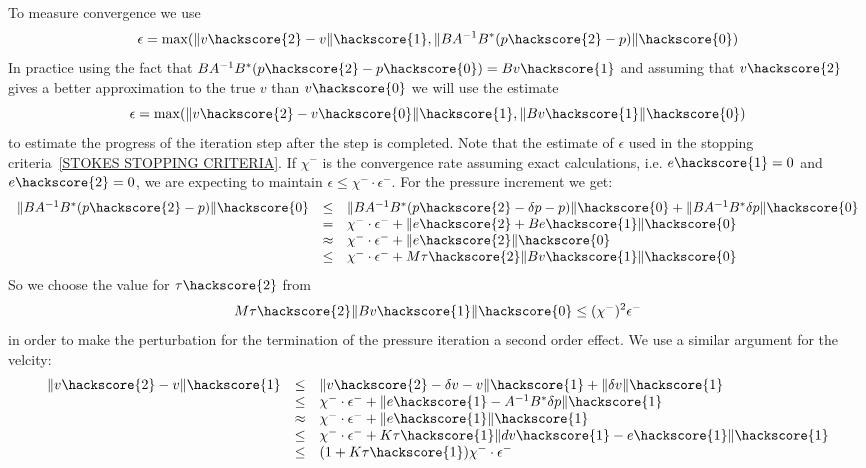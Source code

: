 To measure convergence we use
\begin{equation} 
\epsilon = \max(\|v\hackscore{2}-v\|\hackscore{1}, \|B A^{-1} B^{*} (p\hackscore{2}-p)\|\hackscore{0})
\end{equation}
In practice using the fact that $B A^{-1} B^{*} (p\hackscore{2}-p\hackscore{0}) = B v\hackscore{1}$
and assuming that $v\hackscore{2}$ gives a better approximation to the true $v$ than
$v\hackscore{0}$ we will use the estimate
\begin{equation} 
\epsilon = \max(\|v\hackscore{2}-v\hackscore{0}\|\hackscore{1}, \|B v\hackscore{1}\|\hackscore{0})
\end{equation}
to estimate the progress of the iteration step after the step is completed. 
Note that the estimate of $\epsilon$   
used in the stopping criteria~\ref{STOKES STOPPING CRITERIA}. If $\chi^{-}$ is the convergence rate assuming
exact calculations, i.e. $e\hackscore{1}=0$ and $e\hackscore{2}=0$, we are expecting 
to maintain $\epsilon \le \chi^{-} \cdot \epsilon^{-}$. For the 
pressure increment we get:
\begin{equation} \label{STOKES EST 1}
\begin{array}{rcl}
\|B A^{-1} B^{*} (p\hackscore{2}-p)\|\hackscore{0}
 & \le & \|B A^{-1} B^{*} (p\hackscore{2}-\delta p-p)\|\hackscore{0} +
\|B A^{-1} B^{*} \delta p\|\hackscore{0} \\
 & = & \chi^{-} \cdot \epsilon^{-} + \|e\hackscore{2} + B e\hackscore{1}\|\hackscore{0}  \\
& \approx & \chi^{-} \cdot \epsilon^{-} + \|e\hackscore{2}\|\hackscore{0} \\
& \le & \chi^{-} \cdot \epsilon^{-} + M \tau\hackscore{2} \|B v\hackscore{1}\|\hackscore{0} \\  
\end{array}
\end{equation}
So we choose the value for $\tau\hackscore{2}$ from 
\begin{equation} \label{STOKES TOL2}
 M \tau\hackscore{2} \|B v\hackscore{1}\|\hackscore{0}  \le (\chi^{-})^2 \epsilon^{-}
\end{equation}
in order to make the perturbation for the termination of the pressure iteration a second order effect. We use a
similar argument for the velcity:
\begin{equation}\label{STOKES EST 2}
\begin{array}{rcl}
\|v\hackscore{2}-v\|\hackscore{1} & \le & \|v\hackscore{2}-\delta v-v\|\hackscore{1} + \| \delta v\|\hackscore{1} \\
& \le &  \chi^{-} \cdot \epsilon^{-}  + \| e\hackscore{1} -  A^{-1} B^{*}\delta p \|\hackscore{1} \\
& \approx &  \chi^{-} \cdot \epsilon^{-}  + \| e\hackscore{1} \|\hackscore{1} \\
& \le &  \chi^{-} \cdot \epsilon^{-}  +  K \tau\hackscore{1} \| dv\hackscore{1} - e\hackscore{1} \|\hackscore{1}
\\
& \le &  ( 1  + K \tau\hackscore{1}) \chi^{-} \cdot \epsilon^{-}
\end{array}
\end{equation}
